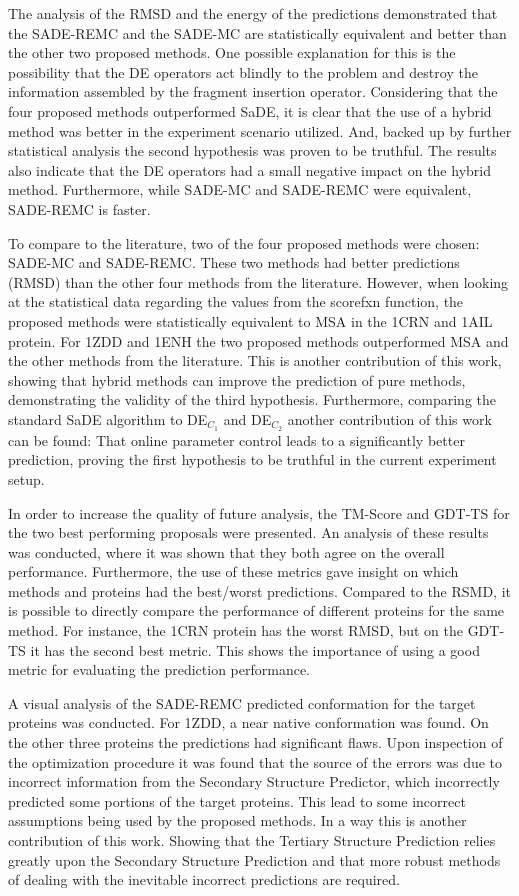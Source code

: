 The analysis of the RMSD and the energy of the predictions
demonstrated that the SADE-REMC and the SADE-MC are statistically
equivalent and better than the other two proposed methods.
One possible explanation for this is the possibility that the DE
operators act blindly to the problem and destroy the information
assembled by the fragment insertion operator. Considering that the
four proposed methods outperformed SaDE, it is clear that the use
of a hybrid method was better in the experiment scenario utilized.
And, backed up by further statistical analysis the second hypothesis
was proven to be truthful. The results also indicate that
the DE operators had a small negative
impact on the hybrid method. Furthermore, while SADE-MC and SADE-REMC
were equivalent, SADE-REMC is faster.

To compare to the literature, two of the four proposed methods were
chosen: SADE-MC and SADE-REMC. These two methods had better
predictions (RMSD) than the other four methods from the literature.
However, when looking at the statistical data regarding the values
from the scorefxn function, the proposed methods were statistically
equivalent to MSA in the 1CRN and 1AIL protein. For 1ZDD and 1ENH
the two proposed methods outperformed MSA and the other methods
from the literature. This is another contribution of this work,
showing that hybrid methods can improve the prediction
of pure methods, demonstrating the validity of the third hypothesis.
Furthermore, comparing the standard SaDE
algorithm to DE$_{C_1}$ and DE$_{C_2}$ another contribution
of this work can be found: That online parameter control
leads to a significantly better prediction, proving the first
hypothesis to be truthful in the current experiment setup. 

In order to increase the quality of future analysis, the TM-Score and GDT-TS for the two best performing proposals were presented. An analysis of these results was conducted, where it was shown that they both agree on the overall performance. Furthermore, the use of these metrics gave insight on which
methods and proteins had the best/worst predictions. Compared to the RSMD, it is possible to directly compare the performance of different proteins for the same method. For instance, the 1CRN protein has the worst RMSD, but on the
GDT-TS it has the second best metric. This shows the importance of using a good metric for evaluating the prediction performance.

A visual analysis of the SADE-REMC predicted conformation
for the target proteins was conducted. For 1ZDD, a near native
conformation was found. On the other three proteins the
predictions had significant flaws. Upon inspection
of the optimization procedure it was found that the 
source of the errors was due to incorrect information
from the Secondary Structure Predictor, which
incorrectly predicted some portions of the target
proteins. This lead to some incorrect assumptions being
used by the proposed methods. In a way this is another
contribution of this work. Showing that the Tertiary
Structure Prediction relies greatly upon the
Secondary Structure Prediction and that more robust
methods of dealing with the inevitable incorrect predictions
are required.

